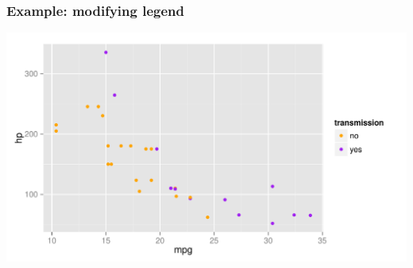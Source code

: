 \documentclass[12pt]{beamer}\usepackage[]{graphicx}\usepackage[]{color}
\newenvironment{knitrout}{}{} %
\begin{document}

\begin{frame}[fragile]
\frametitle{Example: modifying legend}

\begin{knitrout}\footnotesize
{}\color{fgcolor}

{\centering \includegraphics[width=.9\linewidth,height=.5\linewidth]{figure/legend_guide-1} 

}



\end{knitrout}
\end{frame}


\begin{frame}
\begin{center}
\Huge{}
\end{center}
\end{frame}

\end{document}
